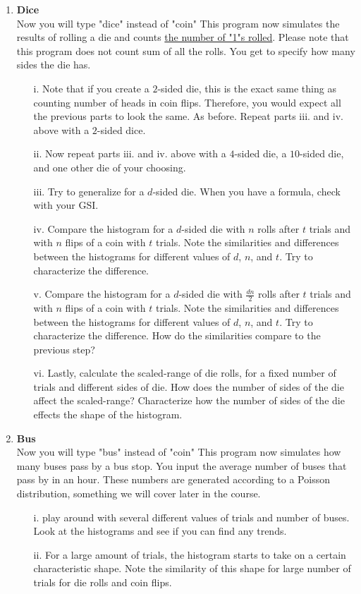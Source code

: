 \documentclass[11pt]{article}
\begin{document}
\begin{enumerate}
\item {\bf Dice}   \\
Now you will type "dice" instead of "coin" This program now simulates the results of rolling a die and counts \underline{the number of "1"s rolled}. Please note that this program does not count sum of all the rolls. You get to specify how many sides the die has.
\begin{enumerate}
\item[i.] Note that if you create a $2$-sided die, this is the exact same thing as counting number of heads in coin flips. Therefore, you would expect all the previous parts to look the same. As before. Repeat parts iii. and iv. above with a $2$-sided dice.
\item[ii.] Now repeat parts iii. and iv. above with a $4$-sided die, a $10$-sided die, and one other die of your choosing.
\item[iii.] Try to generalize for a $d$-sided die. When you have a formula, check with your GSI.
\item[iv.] Compare the histogram for a $d$-sided die with $n$ rolls after $t$ trials and with $n$ flips of a coin with $t$ trials. Note the similarities and differences between the histograms for different values of $d$, $n$, and $t$. Try to characterize the difference.
\item[v.] Compare the histogram for a $d$-sided die with $\frac{dn}{2}$ rolls after $t$ trials and with $n$ flips of a coin with $t$ trials. Note the similarities and differences between the histograms for different values of $d$, $n$, and $t$. Try to characterize the difference. How do the similarities compare to the previous step?
\item[vi.] Lastly, calculate the scaled-range of die rolls, for a fixed number of trials and different sides of die. How does the number of sides of the die affect the scaled-range? Characterize how the number of sides of the die effects the shape of the histogram.
\end{enumerate}
\item {\bf Bus}   \\
Now you will type "bus" instead of "coin" This program now simulates how many buses pass by a bus stop. You input the average number of buses that pass by in an hour. These numbers are generated according to a Poisson distribution, something we will cover later in the course.
\begin{enumerate}
\item[i.] play around with several different values of trials and number of buses. Look at the histograms and see if you can find any trends.
\item[ii.] For a large amount of trials, the histogram starts to take on a certain characteristic shape. Note the similarity of this shape for large number of trials for die rolls and coin flips.
\end{enumerate}




   
 \end{enumerate}
\end{document}
